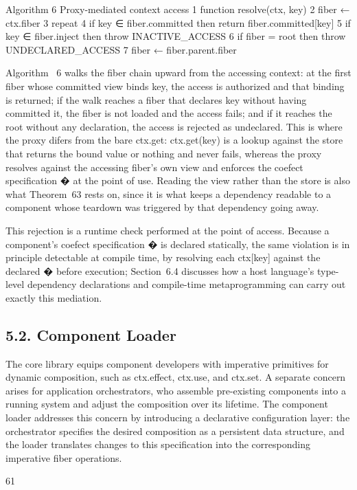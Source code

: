 \documentclass[
  10
]{article}
\begin{document}
Algorithm 6 Proxy-mediated context access 1 function resolve(ctx, key) 2
fiber ← ctx.fiber 3 repeat 4 if key ∈ fiber.committed then return
fiber.committed{[}key{]} 5 if key ∈ fiber.inject then throw
INACTIVE\_ACCESS 6 if fiber = root then throw UNDECLARED\_ACCESS 7 fiber
← fiber.parent.fiber

Algorithm~ 6 walks the fiber chain upward from the accessing context: at
the first fiber whose committed view binds key, the access is authorized
and that binding is returned; if the walk reaches a fiber that declares
key without having committed it, the fiber is not loaded and the access
fails; and if it reaches the root without any declaration, the access is
rejected as undeclared. This is where the proxy difers from the bare
ctx.get: ctx.get(key) is a lookup against the store that returns the
bound value or nothing and never fails, whereas the proxy resolves
against the accessing fiber's own view and enforces the coefect
specification � at the point of use. Reading the view rather than the
store is also what Theorem~63 rests on, since it is what keeps a
dependency readable to a component whose teardown was triggered by that
dependency going away.

This rejection is a runtime check performed at the point of access.
Because a component's coefect specification � is declared statically,
the same violation is in principle detectable at compile time, by
resolving each ctx{[}key{]} against the declared � before execution;
Section~6.4 discusses how a host language's type-level dependency
declarations and compile-time metaprogramming can carry out exactly this
mediation.

\subsection{5.2. Component Loader}\label{component-loader}

The core library equips component developers with imperative primitives
for dynamic composition, such as ctx.effect, ctx.use, and ctx.set. A
separate concern arises for application orchestrators, who assemble
pre-existing components into a running system and adjust the composition
over its lifetime. The component loader addresses this concern by
introducing a declarative configuration layer: the orchestrator
specifies the desired composition as a persistent data structure, and
the loader translates changes to this specification into the
corresponding imperative fiber operations.

61
\end{document}
